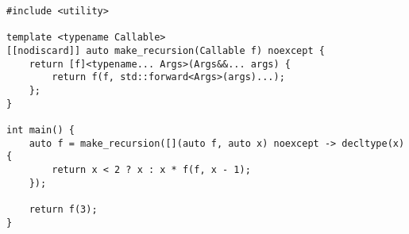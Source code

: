 \begin{lstlisting}[title=\href{https://godbolt.org/z/Ycnxjf}{\texttt{godbolt.org/z/Ycnxjf}}]
#include <utility>

template <typename Callable>
[[nodiscard]] auto make_recursion(Callable f) noexcept {
    return [f]<typename... Args>(Args&&... args) {
        return f(f, std::forward<Args>(args)...);
    };
}

int main() {
    auto f = make_recursion([](auto f, auto x) noexcept -> decltype(x) {
        return x < 2 ? x : x * f(f, x - 1);
    });

    return f(3);
}
\end{lstlisting}
